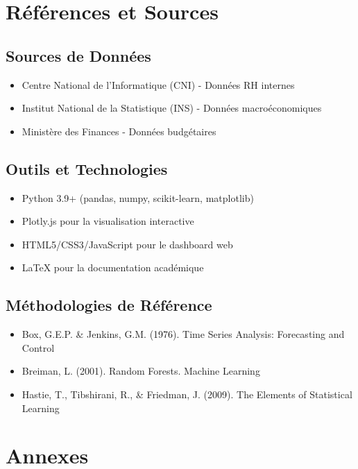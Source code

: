 \documentclass[12pt,a4paper]{article}
\begin{document}
\newpage

\section{Références et Sources}

\subsection{Sources de Données}
\begin{itemize}
    \item Centre National de l'Informatique (CNI) - Données RH internes
    \item Institut National de la Statistique (INS) - Données macroéconomiques
    \item Ministère des Finances - Données budgétaires
\end{itemize}

\subsection{Outils et Technologies}
\begin{itemize}
    \item Python 3.9+ (pandas, numpy, scikit-learn, matplotlib)
    \item Plotly.js pour la visualisation interactive
    \item HTML5/CSS3/JavaScript pour le dashboard web
    \item LaTeX pour la documentation académique
\end{itemize}

\subsection{Méthodologies de Référence}
\begin{itemize}
    \item Box, G.E.P. \& Jenkins, G.M. (1976). Time Series Analysis: Forecasting and Control
    \item Breiman, L. (2001). Random Forests. Machine Learning
    \item Hastie, T., Tibshirani, R., \& Friedman, J. (2009). The Elements of Statistical Learning
\end{itemize}

\newpage

\section{Annexes}
\end{document}
